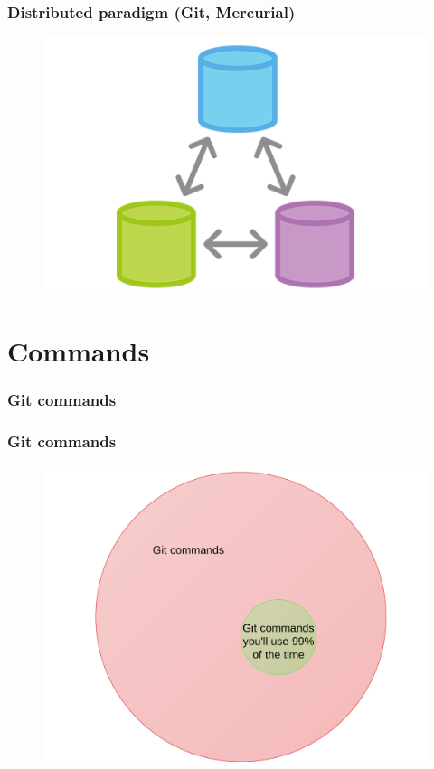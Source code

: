 \documentclass{beamer}
\begin{document}
\begin{frame}
    \frametitle{Distributed paradigm (Git, Mercurial)}
    \begin{figure}[h!]
        \begin{center}
            \includegraphics[scale=0.55]{distributed.png}
        \end{center}
    \end{figure}
\end{frame}

\section{Commands}
\begin{frame}
    \frametitle{Git commands}
    \tableofcontents[Commands]
\end{frame}

\begin{frame}
    \frametitle{Git commands}
    \begin{figure}[h!]
        \begin{center}
            \includegraphics[scale=0.09]{git_commands1.png}
        \end{center} \end{figure}
\end{frame}
\end{document}
